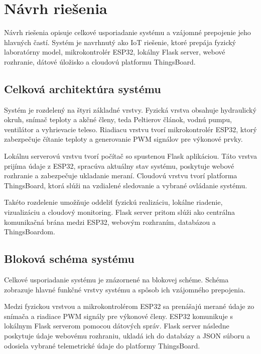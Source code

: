 \section{Návrh riešenia}

Návrh riešenia opisuje celkové usporiadanie systému a vzájomné prepojenie jeho hlavných častí. 
Systém je navrhnutý ako IoT riešenie, ktoré prepája fyzický laboratórny model, 
mikrokontrolér ESP32, lokálny Flask server, webové rozhranie, dátové úložisko a 
cloudovú platformu ThingsBoard.

\subsection{Celková architektúra systému}

Systém je rozdelený na štyri základné vrstvy. Fyzická vrstva obsahuje hydraulický okruh, 
snímač teploty a akčné členy, teda Peltierov článok, vodnú pumpu, ventilátor a vyhrievacie 
teleso. Riadiacu vrstvu tvorí mikrokontrolér ESP32, ktorý zabezpečuje čítanie teploty a 
generovanie PWM signálov pre výkonové prvky.

Lokálnu serverovú vrstvu tvorí počítač so spustenou Flask aplikáciou. Táto vrstva prijíma 
údaje z ESP32, spracúva aktuálny stav systému, poskytuje webové rozhranie a zabezpečuje 
ukladanie meraní. Cloudovú vrstvu tvorí platforma ThingsBoard, ktorá slúži na vzdialené 
sledovanie a vybrané ovládanie systému.

Takéto rozdelenie umožňuje oddeliť fyzickú realizáciu, lokálne riadenie, vizualizáciu a 
cloudový monitoring. Flask server pritom slúži ako centrálna komunikačná brána medzi ESP32, 
webovým rozhraním, databázou a ThingsBoardom.

\subsection{Bloková schéma systému}

Celkové usporiadanie systému je znázornené na blokovej schéme. Schéma zobrazuje hlavné 
funkčné vrstvy systému a spôsob ich vzájomného prepojenia.

\begin{figure}[H]
    \centering
    \label{fig:blokova_schema_iot}
\end{figure}

Medzi fyzickou vrstvou a mikrokontrolérom ESP32 sa prenášajú merané údaje zo snímača a 
riadiace PWM signály pre výkonové členy. ESP32 komunikuje s lokálnym Flask serverom pomocou 
dátových správ. Flask server následne poskytuje údaje webovému rozhraniu, ukladá ich do 
databázy a JSON súboru a odosiela vybrané telemetrické údaje do platformy ThingsBoard.

